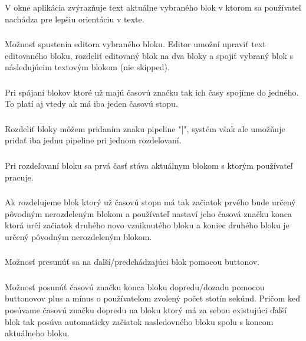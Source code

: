 \documentclass{article}
\begin{document}
\subsubsection{}
V okne aplikácia zvýrazňuje text aktuálne vybraného blok v ktorom sa používateľ nachádza pre lepšiu orientáciu v texte.

\subsubsection{}
Možnosť spustenia editora vybraného bloku. Editor umožní upraviť text editovaného bloku, rozdeliť editovaný blok na dva bloky a spojiť vybraný blok s následujúcim textovým blokom (nie skipped). 

\subsubsection{}
Pri spájaní blokov ktoré už majú časovú značku tak ich časy spojíme do jedného. To platí aj vtedy ak má iba jeden časovú stopu. 

\subsubsection{}
Rozdeliť bloky môžem pridaním znaku pipeline "|", systém však ale umožňuje pridať iba jednu pipeline pri jednom rozdeľovaní.

\subsubsection{}
Pri rozdeľovaní bloku sa prvá časť stáva aktuálnym blokom s ktorým používateľ pracuje. 

\subsubsection{}
Ak rozdelujeme blok ktorý už časovú stopu má tak začiatok prvého bude určený pôvodným nerozdeleným blokom a používateľ nastaví jeho časová značku konca ktorá určí začiatok druhého novo vzniknutého bloku a koniec druhého bloku je určený pôvodným nerozdeleným blokom.

\subsubsection{}
Možnosť presunúť sa na ďalší/predchádzajúci blok pomocou buttonov. 

\subsubsection{}
Možnosť posunúť časovú značku konca bloku dopredu/dozadu pomocou buttonovov plus a mínus o používateľom zvolený počet stotín sekúnd. Pričom keď posúvame časovú značku dopredu na bloku ktorý má za sebou existujúci ďalší blok tak posúva automaticky začiatok nasledovného bloku spolu s koncom aktuálneho bloku.
\end{document}
